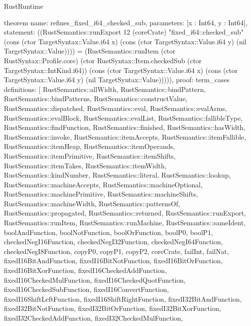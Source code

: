 \begin{lexlean}{RustRuntime}
\begin{semanticmodule}
theorem{
  name: refines_fixed_i64_checked_sub,
  parameters: [x : Int64, y : Int64],
  statement: ((RustSemantics::runExport 12 (coreCrate) "fixed_i64::checked_sub" (cons (ctor TargetSyntax::Value.i64 x) (cons (ctor TargetSyntax::Value.i64 y) (nil TargetSyntax::Value)))) = (RustSemantics::runItem (ctor RustSyntax::Profile.core) (ctor RustSyntax::Item.checkedSub (ctor TargetSyntax::IntKind.i64)) (cons (ctor TargetSyntax::Value.i64 x) (cons (ctor TargetSyntax::Value.i64 y) (nil TargetSyntax::Value))))),
  proof: term_cases{
    definitions: [
      RustSemantics::allWidth,
      RustSemantics::bindPattern,
      RustSemantics::bindPatterns,
      RustSemantics::constructValue,
      RustSemantics::dispatched,
      RustSemantics::eval,
      RustSemantics::evalArms,
      RustSemantics::evalBlock,
      RustSemantics::evalList,
      RustSemantics::fallibleType,
      RustSemantics::findFunction,
      RustSemantics::finished,
      RustSemantics::hasWidth,
      RustSemantics::invoke,
      RustSemantics::itemAccepts,
      RustSemantics::itemFallible,
      RustSemantics::itemHeap,
      RustSemantics::itemOperands,
      RustSemantics::itemPrimitive,
      RustSemantics::itemShifts,
      RustSemantics::itemTakes,
      RustSemantics::itemWidth,
      RustSemantics::kindNumber,
      RustSemantics::literal,
      RustSemantics::lookup,
      RustSemantics::machineAccepts,
      RustSemantics::machineOptional,
      RustSemantics::machinePrimitive,
      RustSemantics::machineShifts,
      RustSemantics::machineWidth,
      RustSemantics::patternsOf,
      RustSemantics::propagated,
      RustSemantics::returned,
      RustSemantics::runExport,
      RustSemantics::runItem,
      RustSemantics::runMachine,
      RustSemantics::sameIdent,
      boolAndFunction,
      boolNotFunction,
      boolOrFunction,
      boolP0,
      boolP1,
      checkedNegI16Function,
      checkedNegI32Function,
      checkedNegI64Function,
      checkedNegI8Function,
      copyP0,
      copyP1,
      copyP2,
      coreCrate,
      failInt,
      failNat,
      fixedI16BitAndFunction,
      fixedI16BitNotFunction,
      fixedI16BitOrFunction,
      fixedI16BitXorFunction,
      fixedI16CheckedAddFunction,
      fixedI16CheckedMulFunction,
      fixedI16CheckedQuotFunction,
      fixedI16CheckedSubFunction,
      fixedI16ConvertFunction,
      fixedI16ShiftLeftFunction,
      fixedI16ShiftRightFunction,
      fixedI32BitAndFunction,
      fixedI32BitNotFunction,
      fixedI32BitOrFunction,
      fixedI32BitXorFunction,
      fixedI32CheckedAddFunction,
      fixedI32CheckedMulFunction,
}}
\end{semanticmodule}
\end{lexlean}
